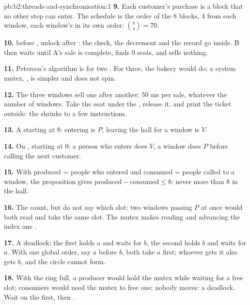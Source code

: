 \begin{solution}{pb:b2:threads-and-synchronisation:1}
\textbf{9.} Each customer's purchase is a block that no other step can enter. The schedule is the order of the 8
blocks, 4 from each window, each window's in its own order: $\binom{8}{4} = 70$.

\textbf{10.}  before , unlock after : the check, the
decrement and the record go inside. B then waits until A's sale is complete, finds 0 seats, and sells nothing.

\textbf{11.} Peterson's algorithm is for two . For three, the bakery would do; a system mutex,
, is simpler and does not spin.

\textbf{12.} The three windows sell one after another: 50 ms per sale, whatever the number of windows. Take the seat
under the , release it, and print the ticket outside: the  shrinks to a few instructions.

\textbf{13.} A   starting at 8: entering is $P$, leaving the hall for a window is $V$.

\textbf{14.} On , starting at 0: a person who enters does $V$, a window does $P$ before calling the next
customer.

\textbf{15.} With produced = people who entered and consumed = people called to a window, the proposition gives
$\text{produced} - \text{consumed} \le 8$: never more than 8 in the hall.

\textbf{16.} The  count, but do not say which slot: two windows passing $P$ at once would both read
 and take the same slot. The mutex makes reading and advancing the index one .

\textbf{17.} A deadlock: the first holds $a$ and waits for $b$, the second holds $b$ and waits for $a$. With one global
order, say $a$ before $b$, both take $a$ first; whoever gets it also gets $b$, and the circle cannot form.

\textbf{18.} With the ring full, a producer would hold the mutex while waiting for a free slot; consumers would need
the mutex to free one; nobody moves: a deadlock. Wait on the  first, then .


\end{solution}
